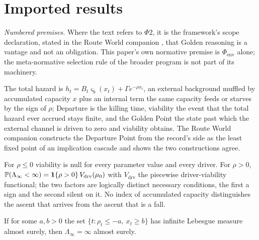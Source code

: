 \section{Imported results}\label{sec:imports}

\noindent\emph{Numbered premises.} Where the text refers to $\Phi2$,
it is the framework's scope declaration, stated in the Route World
companion \cite{GoldenRouteWorld}, that Golden reasoning is a vantage and not
an obligation. This paper's own normative premise is
$\Phi_{\mathrm{env}}$ alone; the meta-normative selection rule of the
broader program is not part of its machinery.


\begin{definition}\label{imp:model}
The total hazard is $h_t=B_t\varsigma_b(x_t)+\Gamma e^{-\rho x_t}$, an
external background muffled by accumulated capacity $x$ plus an
internal term the same capacity feeds or starves by the sign of $\rho$;
Departure is the killing time, viability the event that the total
hazard ever accrued stays finite, and the Golden Point the state past
which the external channel is driven to zero and viability obtains. The
Route World companion constructs the Departure Point from the record's
side as the least fixed point of an implication cascade and shows the
two constructions agree.
\end{definition}

\begin{theorem}
\label{imp:twocond}
For $\rho\le0$ viability is null for every parameter value and every
driver. For $\rho>0$, $\mathbb{P}(\Lambda_\infty<\infty)=\mathbf{1}\{\rho>0\}\,V_{\mathrm{drv}}(\mu_0)$
with $V_{\mathrm{drv}}$ the piecewise driver-viability functional; the
two factors are logically distinct necessary conditions, the first a
sign and the second silent on it. No index of accumulated capacity
distinguishes the ascent that arrives from the ascent that is a fall.
\end{theorem}

\begin{corollary}\label{imp:overlap}
If for some $a,b>0$ the set $\{t:\rho_t\le-a,\ x_t\ge b\}$ has infinite
Lebesgue measure almost surely, then $\Lambda_\infty=\infty$ almost
surely.
\end{corollary}

